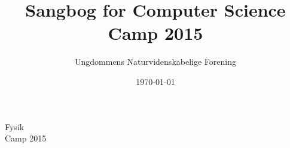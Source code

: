 \documentclass[a4paper]{article}
\title{Sangbog for Computer Science Camp 2015}
\author{Ungdommens Naturvidenskabelige Forening}
\date{\today}
\begin{document}
\pagestyle{empty}
\begin{center}
\selectfont\Huge Fysik\\ Camp 2015
\end{center}
\end{document}
